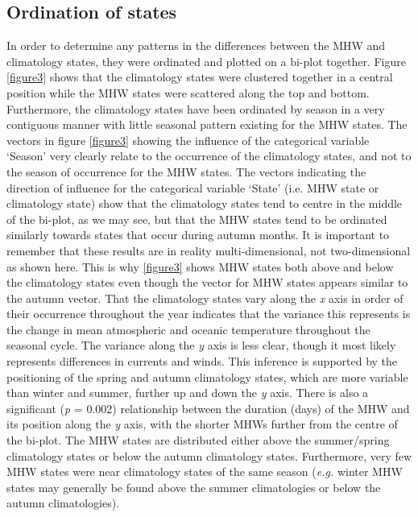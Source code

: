 \documentclass[utf8]{frontiersSCNS}
\begin{document}
\subsection{Ordination of states}
In order to determine any patterns in the differences between the MHW and climatology states, they were ordinated and plotted on a bi-plot together. Figure \ref{figure3} shows that the climatology states were clustered together in a central position while the MHW states were scattered along the top and bottom. Furthermore, the climatology states have been ordinated by season in a very contiguous manner with little seasonal pattern existing for the MHW states. The vectors in figure \ref{figure3} showing the influence of the categorical variable `Season' very clearly relate to the occurrence of the climatology states, and not to the season of occurrence for the MHW states. The vectors indicating the direction of influence for the categorical variable `State' (i.e. MHW state or climatology state) show that the climatology states tend to centre in the middle of the bi-plot, as we may see, but that the MHW states tend to be ordinated similarly towards states that occur during autumn months. It is important to remember that these results are in reality multi-dimensional, not two-dimensional as shown here. This is why \ref{figure3} shows MHW states both above and below the climatology states even though the vector for MHW states appears similar to the autumn vector. That the climatology states vary along the \emph{x} axis in order of their occurrence throughout the year indicates that the variance this represents is the change in mean atmospheric and oceanic temperature throughout the seasonal cycle. The variance along the \emph{y} axis is less clear, though it most likely represents differences in currents and winds. This inference is supported by the positioning of the spring and autumn climatology states, which are more variable than winter and summer, further up and down the \emph{y} axis. There is also a significant (\emph{p} = 0.002) relationship between the duration (days) of the MHW and its position along the \emph{y} axis, with the shorter MHWs further from the centre of the bi-plot. The MHW states are distributed either above the summer/spring climatology states or below the autumn climatology states. Furthermore, very few MHW states were near climatology states of the same season (\emph{e.g.} winter MHW states may generally be found above the summer climatologies or below the autumn climatologies). 


\end{document}
